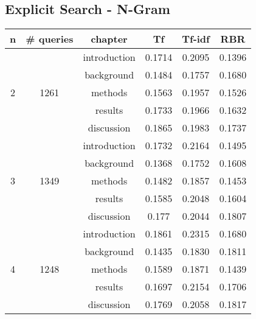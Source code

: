 \subsection{Explicit Search - N-Gram}
\begin{center}
  \begin{tabular}{ | c | c | c | c | c | c |}
    \hline
    \rowcolor{lightblue}
    \textbf{n} & \textbf{\# queries} & \textbf{chapter} & \textbf{Tf} & \textbf{Tf-idf} & \textbf{RBR} \\ \hline
    \multirow{5}{*}{2} & \multirow{5}{*}{1261} & introduction & 0.1714 & 0.2095 & 0.1396 \\ \cline{3-6}
                                              && background   & 0.1484 & 0.1757 & 0.1680 \\ \cline{3-6}
                                              && methods      & 0.1563 & 0.1957 & 0.1526 \\ \cline{3-6}
                                              && results      & 0.1733 & 0.1966 & 0.1632 \\ \cline{3-6}
                                              && discussion   & 0.1865 & 0.1983 & 0.1737 \\ \hline \hline
    \multirow{5}{*}{3} & \multirow{5}{*}{1349} & introduction & 0.1732 & 0.2164 & 0.1495 \\ \cline{3-6}
                                              && background   & 0.1368 & 0.1752 & 0.1608 \\ \cline{3-6}
                                              && methods      & 0.1482 & 0.1857 & 0.1453 \\ \cline{3-6}
                                              && results      & 0.1585 & 0.2048 & 0.1604 \\ \cline{3-6}
                                              && discussion   & 0.177  & 0.2044 & 0.1807 \\ \hline \hline
    \multirow{5}{*}{4} & \multirow{5}{*}{1248} & introduction & 0.1861 & 0.2315 & 0.1680 \\ \cline{3-6}
                                              && background   & 0.1435 & 0.1830 & 0.1811 \\ \cline{3-6}
                                              && methods      & 0.1589 & 0.1871 & 0.1439 \\ \cline{3-6}
                                              && results      & 0.1697 & 0.2154 & 0.1706 \\ \cline{3-6}
                                              && discussion   & 0.1769 & 0.2058 & 0.1817 \\ \hline
  \end{tabular}
\end{center}


